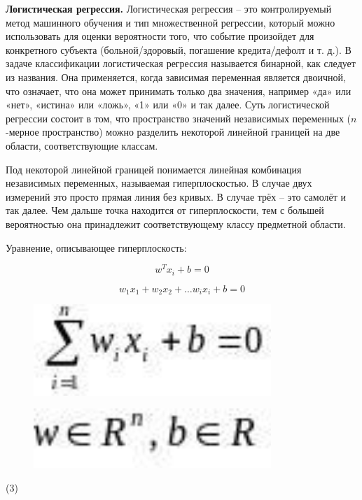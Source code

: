 {\bfseries Логистическая регрессия.} Логистическая регрессия -- это
контролируемый метод машинного обучения и тип множественной регрессии,
который можно использовать для оценки вероятности того, что событие
произойдет для конкретного субъекта (больной/здоровый, погашение
кредита/дефолт и т. д.). В задаче классификации логистическая регрессия
называется бинарной, как следует из названия. Она применяется, когда
зависимая переменная является двоичной, что означает, что она может
принимать только два значения, например «да» или «нет», «истина» или
«ложь», «1» или «0» и так далее. Суть логистической регрессии состоит в
том, что пространство значений независимых переменных
($n$-мерное пространство) можно разделить
некоторой линейной границей на две области, соответствующие классам.

Под некоторой линейной границей понимается линейная комбинация
независимых переменных, называемая гиперплоскостью. В случае двух
измерений это просто прямая линия без кривых. В случае трёх -- это
самолёт и так далее. Чем дальше точка находится от гиперплоскости, тем с
большей вероятностью она принадлежит соответствующему классу предметной
области.

Уравнение, описывающее гиперплоскость:

\begin{equation}
	w^Tx_i+b=0
\end{equation}

\begin{equation}
w_1x_1+w_2x_2+\ldots w_ix_i+b=0
\end{equation}

\begin{figure}[H]
	\centering
	\includegraphics[width=0.8\textwidth]{assets/85}
	\caption*{}
\end{figure} \begin{figure}[H]
	\centering
	\includegraphics[width=0.8\textwidth]{assets/86}
	\caption*{}
\end{figure}
(3)

